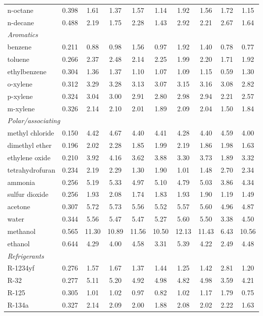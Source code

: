 \begin{table}[H]
\begin{tabular}{lccccccccc}
n-octane & 0.398 & 1.61 & 1.37 & 1.57 & 1.14 & 1.92 & 1.56 & 1.72 & 1.15 \\
n-decane & 0.488 & 2.19 & 1.75 & 2.28 & 1.43 & 2.92 & 2.21 & 2.67 & 1.64 \\
\multicolumn{10}{l}{\emph{Aromatics}} \\
benzene & 0.211 & 0.88 & 0.98 & 1.56 & 0.97 & 1.92 & 1.40 & 0.78 & 0.77 \\
toluene & 0.266 & 2.37 & 2.48 & 2.14 & 2.25 & 1.99 & 2.20 & 1.71 & 1.92 \\
ethylbenzene & 0.304 & 1.36 & 1.37 & 1.10 & 1.07 & 1.09 & 1.15 & 0.59 & 1.30 \\
o-xylene & 0.312 & 3.29 & 3.28 & 3.13 & 3.07 & 3.15 & 3.16 & 3.08 & 2.82 \\
p-xylene & 0.324 & 3.04 & 3.00 & 2.91 & 2.80 & 2.98 & 2.94 & 2.21 & 2.57 \\
m-xylene & 0.326 & 2.14 & 2.10 & 2.01 & 1.89 & 2.09 & 2.04 & 1.50 & 1.84 \\
\multicolumn{10}{l}{\emph{Polar/associating}} \\
methyl chloride & 0.150 & 4.42 & 4.67 & 4.40 & 4.41 & 4.28 & 4.40 & 4.59 & 4.00 \\
dimethyl ether & 0.196 & 2.02 & 2.28 & 1.85 & 1.99 & 2.19 & 1.86 & 1.98 & 1.63 \\
ethylene oxide & 0.210 & 3.92 & 4.16 & 3.62 & 3.88 & 3.30 & 3.73 & 1.89 & 3.32 \\
tetrahydrofuran & 0.234 & 2.19 & 2.29 & 1.30 & 1.90 & 1.01 & 1.48 & 2.70 & 2.34 \\
ammonia & 0.256 & 5.19 & 5.33 & 4.97 & 5.10 & 4.79 & 5.03 & 3.86 & 4.34 \\
sulfur dioxide & 0.256 & 1.93 & 2.08 & 1.74 & 1.83 & 1.93 & 1.90 & 1.19 & 1.49 \\
acetone & 0.307 & 5.72 & 5.73 & 5.56 & 5.52 & 5.57 & 5.60 & 4.96 & 4.87 \\
water & 0.344 & 5.56 & 5.47 & 5.47 & 5.27 & 5.60 & 5.50 & 3.38 & 4.50 \\
methanol & 0.565 & 11.30 & 10.89 & 11.56 & 10.50 & 12.13 & 11.43 & 6.43 & 10.56 \\
ethanol & 0.644 & 4.29 & 4.00 & 4.58 & 3.31 & 5.39 & 4.22 & 2.49 & 4.48 \\
\multicolumn{10}{l}{\emph{Refrigerants}} \\
R-1234yf & 0.276 & 1.57 & 1.67 & 1.37 & 1.44 & 1.25 & 1.42 & 2.81 & 1.20 \\
R-32 & 0.277 & 5.11 & 5.20 & 4.92 & 4.98 & 4.82 & 4.98 & 3.59 & 4.21 \\
R-125 & 0.305 & 1.01 & 1.02 & 0.97 & 0.82 & 1.02 & 1.17 & 1.79 & 0.75 \\
R-134a & 0.327 & 2.14 & 2.09 & 2.00 & 1.88 & 2.08 & 2.02 & 2.22 & 1.63 \\
\bottomrule
\end{tabular}
\end{table}
